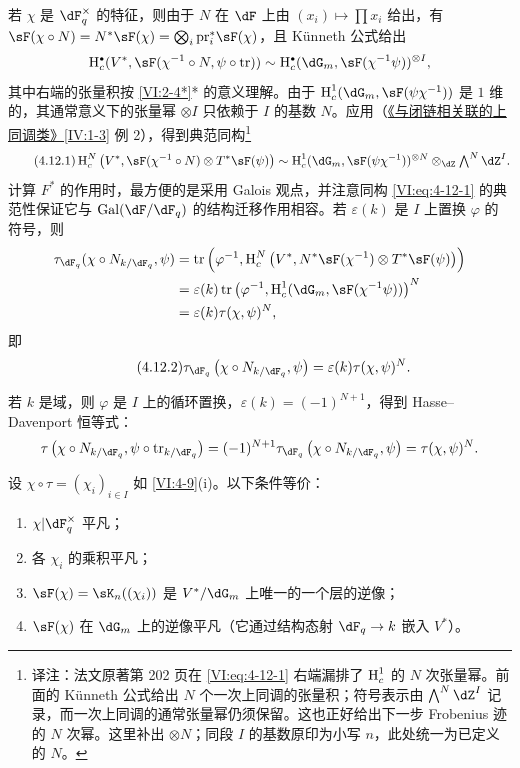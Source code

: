 若 $\chi$ 是 $\dF_q^\times$ 的特征，则由于 $N$ 在 $\dF$ 上由 $(x_i)\mapsto \prod x_i$ 给出，有 $\sF(\chi\circ N)=N^\ast\sF(\chi) = \bigotimes_i \pr_i^\ast\sF(\chi)$，且 K\"unneth 公式给出
\[
  \h_c^\bullet(V^\ast,\sF(\chi^{-1}\circ N,\psi\circ \tr)) \sim \h_c^\bullet(\dG_m,\sF(\chi^{-1}\psi))^{\otimes I} \text{,}
\]
其中右端的张量积按 \ref{VI:2-4*}* 的意义理解。由于 $\h_c^1(\dG_m,\sF(\psi\chi^{-1}))$ 是 $1$ 维的，其通常意义下的张量幂 $\otimes I$ 只依赖于 $I$ 的基数 $N$。应用（\hyperref[IV]{《与闭链相关联的上同调类》}\ref{IV:1-3} 例 2），得到典范同构\footnote{译注：法文原著第 202 页在 \eqref{VI:eq:4-12-1} 右端漏排了 $\operatorname{H}_c^1$ 的 $N$ 次张量幂。前面的 K\"unneth 公式给出 $N$ 个一次上同调的张量积；符号表示由 $\bigwedge^N\dZ^I$ 记录，而一次上同调的通常张量幂仍须保留。这也正好给出下一步 Frobenius 迹的 $N$ 次幂。这里补出 $\otimes N$；同段 $I$ 的基数原印为小写 $n$，此处统一为已定义的 $N$。}
\begin{equation*}\tag{4.12.1}\label{VI:eq:4-12-1}
  \h_c^N\left(V^\ast,\sF(\chi^{-1}\circ N)\otimes T^\ast \sF(\psi)\right) \sim \h_c^1(\dG_m,\sF(\psi\chi^{-1}))^{\otimes N} \otimes_\dZ \textstyle \bigwedge^N \dZ^I \text{.}
\end{equation*}
计算 $F^\ast$ 的作用时，最方便的是采用 Galois 观点，并注意同构 \eqref{VI:eq:4-12-1} 的典范性保证它与 $\gal(\dF/\dF_q)$ 的结构迁移作用相容。若 $\varepsilon(k)$ 是 $I$ 上置换 $\varphi$ 的符号，则
\begin{align*}
  \tau_{\dF_q}(\chi\circ N_{k/\dF_q},\psi)
    &= \tr\left(\varphi^{-1},\h_c^N\left(V^\ast,N^\ast\sF(\chi^{-1})\otimes T^\ast \sF(\psi)\right)\right) \\
    &= \varepsilon(k) \tr\left(\varphi^{-1},\h_c^1(\dG_m,\sF(\chi^{-1}\psi))\right)^N \\
    &= \varepsilon(k) \tau(\chi,\psi)^N \text{,}
\end{align*}
即
\begin{equation*}\tag{4.12.2}\label{VI:eq:4-12-2}
  \tau_{\dF_q}\left(\chi\circ N_{k/\dF_q},\psi\right) = \varepsilon(k) \tau(\chi,\psi)^N \text{.}
\end{equation*}

若 $k$ 是域，则 $\varphi$ 是 $I$ 上的循环置换，$\varepsilon(k) = (-1)^{N+1}$，得到 Hasse--Davenport 恒等式：
\[
  \tau\left(\chi\circ N_{k/\dF_q},\psi\circ \tr_{k/\dF_q}\right) = (-1)^{N+1} \tau_{\dF_q}\left(\chi\circ N_{k/\dF_q},\psi\right) = \tau(\chi,\psi)^N \text{.}
\]

\begin{lemma_}\label{VI:4-13}
设 $\chi\circ \tau=(\chi_i)_{i\in I}$ 如 \ref{VI:4-9}(i)。以下条件等价：
\begin{enumerate}[\indent (i)]
  \item $\chi| \dF_q^\times$ 平凡；
  \item 各 $\chi_i$ 的乘积平凡；
  \item $\sF(\chi) = \sK_n((\chi_i))$ 是 $V^\ast/\dG_m$ 上唯一的一个层的逆像；
  \item $\sF(\chi)$ 在 $\dG_m$ 上的逆像平凡（它通过结构态射 $\dF_q \to k$ 嵌入 $V^\ast$）。
\end{enumerate}
\end{lemma_}

